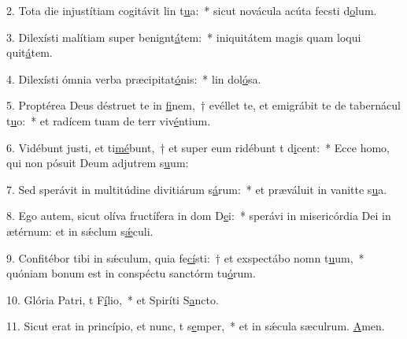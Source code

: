 2. Tota die injustítiam cogitávit lin t\uline{u}a:~* sicut novácula acúta fecsti d\uline{o}lum.\par 
3. Dilexísti malítiam super benignt\uline{á}tem:~* iniquitátem magis quam loqui quit\uline{á}tem.\par 
4. Dilexísti ómnia verba præcipitat\uline{ó}nis:~* lin dol\uline{ó}sa.\par 
5. Proptérea Deus déstruet te in \uline{fi}nem,~† evéllet te, et emigrábit te de tabernácul t\uline{u}o:~* et radícem tuam de terr viv\uline{é}ntium.\par 
6. Vidébunt justi, et ti\uline{mé}bunt,~† et super eum ridébunt t d\uline{i}cent:~* Ecce homo, qui non pósuit Deum adjutrem s\uline{u}um:\par 
7. Sed sperávit in multitúdine divitiárum s\uline{á}rum:~* et præváluit in vanitte s\uline{u}a.\par 
8. Ego autem, sicut olíva fructífera in dom D\uline{e}i:~* sperávi in misericórdia Dei in ætérnum: et in sǽclum s\uline{ǽ}culi.\par 
9. Confitébor tibi in sǽculum, quia fe\uline{cí}sti:~† et exspectábo nomn t\uline{u}um,~* quóniam bonum est in conspéctu sanctórm tu\uline{ó}rum.\par 
10. Glória Patri, t F\uline{í}lio,~* et Spiríti S\uline{a}ncto.\par 
11. Sicut erat in princípio, et nunc, t s\uline{e}mper,~* et in sǽcula sæculrum. \uline{A}men.\par 
